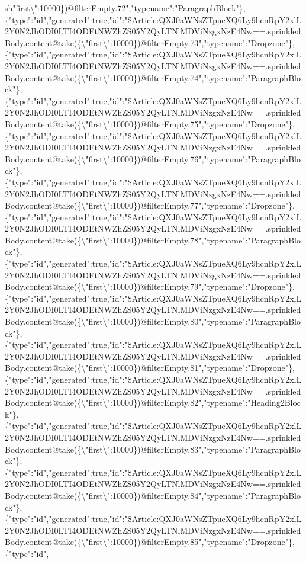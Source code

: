sh{}"first\textbackslash{}":10000\})@filterEmpty.72","typename":"ParagraphBlock"\},\{"type":"id","generated":true,"id":"\$Article:QXJ0aWNsZTpueXQ6Ly9hcnRpY2xlL2Y0N2JhODI0LTI4ODEtNWZhZS05Y2QyLTNlMDViNzgxNzE4Nw==.sprinkledBody.content@take(\{\textbackslash{}"first\textbackslash{}":10000\})@filterEmpty.73","typename":"Dropzone"\},\{"type":"id","generated":true,"id":"\$Article:QXJ0aWNsZTpueXQ6Ly9hcnRpY2xlL2Y0N2JhODI0LTI4ODEtNWZhZS05Y2QyLTNlMDViNzgxNzE4Nw==.sprinkledBody.content@take(\{\textbackslash{}"first\textbackslash{}":10000\})@filterEmpty.74","typename":"ParagraphBlock"\},\{"type":"id","generated":true,"id":"\$Article:QXJ0aWNsZTpueXQ6Ly9hcnRpY2xlL2Y0N2JhODI0LTI4ODEtNWZhZS05Y2QyLTNlMDViNzgxNzE4Nw==.sprinkledBody.content@take(\{\textbackslash{}"first\textbackslash{}":10000\})@filterEmpty.75","typename":"Dropzone"\},\{"type":"id","generated":true,"id":"\$Article:QXJ0aWNsZTpueXQ6Ly9hcnRpY2xlL2Y0N2JhODI0LTI4ODEtNWZhZS05Y2QyLTNlMDViNzgxNzE4Nw==.sprinkledBody.content@take(\{\textbackslash{}"first\textbackslash{}":10000\})@filterEmpty.76","typename":"ParagraphBlock"\},\{"type":"id","generated":true,"id":"\$Article:QXJ0aWNsZTpueXQ6Ly9hcnRpY2xlL2Y0N2JhODI0LTI4ODEtNWZhZS05Y2QyLTNlMDViNzgxNzE4Nw==.sprinkledBody.content@take(\{\textbackslash{}"first\textbackslash{}":10000\})@filterEmpty.77","typename":"Dropzone"\},\{"type":"id","generated":true,"id":"\$Article:QXJ0aWNsZTpueXQ6Ly9hcnRpY2xlL2Y0N2JhODI0LTI4ODEtNWZhZS05Y2QyLTNlMDViNzgxNzE4Nw==.sprinkledBody.content@take(\{\textbackslash{}"first\textbackslash{}":10000\})@filterEmpty.78","typename":"ParagraphBlock"\},\{"type":"id","generated":true,"id":"\$Article:QXJ0aWNsZTpueXQ6Ly9hcnRpY2xlL2Y0N2JhODI0LTI4ODEtNWZhZS05Y2QyLTNlMDViNzgxNzE4Nw==.sprinkledBody.content@take(\{\textbackslash{}"first\textbackslash{}":10000\})@filterEmpty.79","typename":"Dropzone"\},\{"type":"id","generated":true,"id":"\$Article:QXJ0aWNsZTpueXQ6Ly9hcnRpY2xlL2Y0N2JhODI0LTI4ODEtNWZhZS05Y2QyLTNlMDViNzgxNzE4Nw==.sprinkledBody.content@take(\{\textbackslash{}"first\textbackslash{}":10000\})@filterEmpty.80","typename":"ParagraphBlock"\},\{"type":"id","generated":true,"id":"\$Article:QXJ0aWNsZTpueXQ6Ly9hcnRpY2xlL2Y0N2JhODI0LTI4ODEtNWZhZS05Y2QyLTNlMDViNzgxNzE4Nw==.sprinkledBody.content@take(\{\textbackslash{}"first\textbackslash{}":10000\})@filterEmpty.81","typename":"Dropzone"\},\{"type":"id","generated":true,"id":"\$Article:QXJ0aWNsZTpueXQ6Ly9hcnRpY2xlL2Y0N2JhODI0LTI4ODEtNWZhZS05Y2QyLTNlMDViNzgxNzE4Nw==.sprinkledBody.content@take(\{\textbackslash{}"first\textbackslash{}":10000\})@filterEmpty.82","typename":"Heading2Block"\},\{"type":"id","generated":true,"id":"\$Article:QXJ0aWNsZTpueXQ6Ly9hcnRpY2xlL2Y0N2JhODI0LTI4ODEtNWZhZS05Y2QyLTNlMDViNzgxNzE4Nw==.sprinkledBody.content@take(\{\textbackslash{}"first\textbackslash{}":10000\})@filterEmpty.83","typename":"ParagraphBlock"\},\{"type":"id","generated":true,"id":"\$Article:QXJ0aWNsZTpueXQ6Ly9hcnRpY2xlL2Y0N2JhODI0LTI4ODEtNWZhZS05Y2QyLTNlMDViNzgxNzE4Nw==.sprinkledBody.content@take(\{\textbackslash{}"first\textbackslash{}":10000\})@filterEmpty.84","typename":"ParagraphBlock"\},\{"type":"id","generated":true,"id":"\$Article:QXJ0aWNsZTpueXQ6Ly9hcnRpY2xlL2Y0N2JhODI0LTI4ODEtNWZhZS05Y2QyLTNlMDViNzgxNzE4Nw==.sprinkledBody.content@take(\{\textbackslash{}"first\textbackslash{}":10000\})@filterEmpty.85","typename":"Dropzone"\},\{"type":"id",